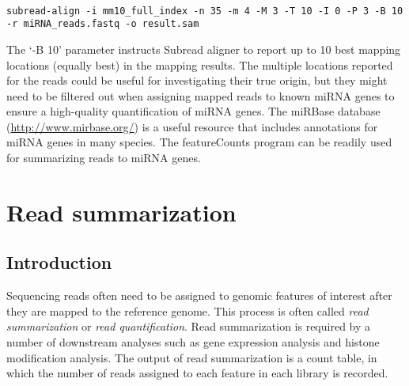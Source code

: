 \documentclass[12pt]{report}
\newcommand{\code}[1]{{\small\texttt{#1}}}
\newcommand{\Subread}{\textsf{Subread}}
\newcommand{\featureCounts}{\textsf{featureCounts}}
\begin{document}
\code{\\
subread-align -i mm10\_full\_index -n 35 -m 4 -M 3 -T 10 -I 0 -P 3 -B 10 \\
-r miRNA\_reads.fastq -o result.sam\\
}

The `-B 10' parameter instructs {\Subread} aligner to report up to 10 best mapping locations (equally best) in the mapping results.
The multiple locations reported for the reads could be useful for investigating their true origin, but they might need to be filtered out when assigning mapped reads to known miRNA genes to ensure a high-quality quantification of miRNA genes.
The miRBase database (\url{http://www.mirbase.org/}) is a useful resource that includes annotations for miRNA genes in many species.
The {\featureCounts} program can be readily used for summarizing reads to miRNA genes.

\chapter{Read summarization}

\section{Introduction}

Sequencing reads often need to be assigned to genomic features of interest after they are mapped to the reference genome.
This process is often called \emph{read summarization} or \emph{read quantification}.
Read summarization is required by a number of downstream analyses such as gene expression analysis and histone modification analysis.
The output of read summarization is a count table, in which the number of reads assigned to each feature in each library is recorded.
\end{document}
